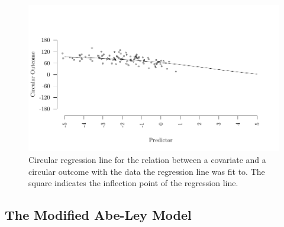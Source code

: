 \documentclass[man]{apa6}
\begin{document}
\begin{figure}[]
  \includegraphics[width = \textwidth]{Plots/circregline.pdf}
  \caption{Circular regression line for the relation between a covariate and a circular outcome with the data the regression line was fit to. The square indicates the inflection point of the regression line.}
  \label{circregline}
\end{figure}

\subsection{The Modified Abe-Ley Model}\label{WeiSSVM}
\end{document}
